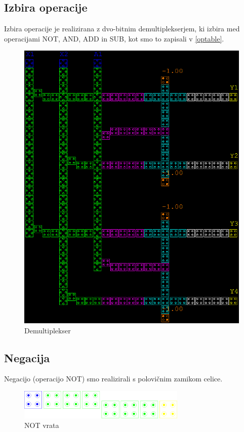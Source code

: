 \documentclass[seminar, slovene]{FRIreport}
\begin{document}
\subsection{Izbira operacije}
Izbira operacije je realizirana z dvo-bitnim demultiplekserjem, ki izbira med operacijami NOT, AND, ADD in SUB, kot smo to zapisali v \autoref{optable}.
\begin{figure}[H]
\includegraphics[width=15cm]{qca/img/demux}
\caption{Demultiplekser}
\label{demux}
\end{figure}

\subsection{Negacija}
Negacijo (operacijo NOT) smo realizirali s polovičnim zamikom celice.
\begin{figure}[H]
\begin{center}
\includegraphics[width=8cm]{qca/img/NOT}
\caption{NOT vrata}
\label{NOT}
\end{center}
\end{figure}
\end{document}
